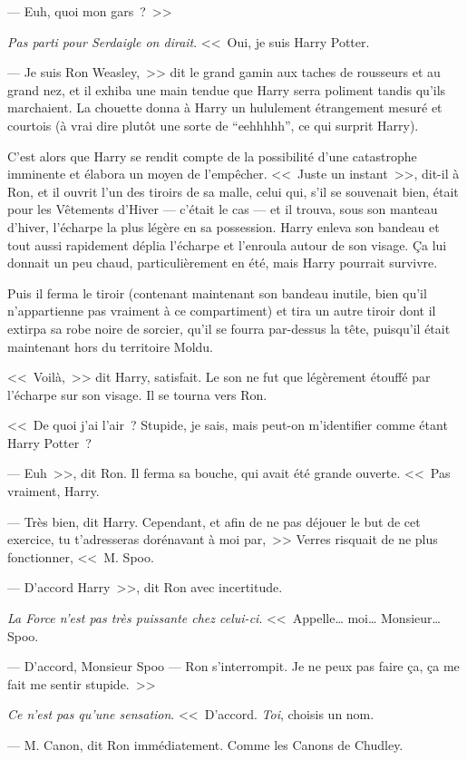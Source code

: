 --- Euh, quoi mon gars~?~>>

\emph{Pas parti pour Serdaigle on dirait}. <<~Oui, je suis Harry Potter.

--- Je suis Ron Weasley,~>> dit le grand gamin aux taches de rousseurs et au grand nez, et il exhiba une main tendue que Harry serra poliment tandis qu'ils marchaient. La chouette donna à Harry un hululement étrangement mesuré et courtois (à vrai dire plutôt une sorte de “eehhhhh”, ce qui surprit Harry).

C'est alors que Harry se rendit compte de la possibilité d'une catastrophe imminente et élabora un moyen de l'empêcher. <<~Juste un instant~>>, dit-il à Ron, et il ouvrit l'un des tiroirs de sa malle, celui qui, s'il se souvenait bien, était pour les Vêtements d'Hiver — c'était le cas — et il trouva, sous son manteau d'hiver, l'écharpe la plus légère en sa possession. Harry enleva son bandeau et tout aussi rapidement déplia l'écharpe et l'enroula autour de son visage. Ça lui donnait un peu chaud, particulièrement en été, mais Harry pourrait survivre.

Puis il ferma le tiroir (contenant maintenant son bandeau inutile, bien qu'il n'appartienne pas vraiment à ce compartiment) et tira un autre tiroir dont il extirpa sa robe noire de sorcier, qu'il se fourra par-dessus la tête, puisqu'il était maintenant hors du territoire Moldu.

<<~Voilà,~>> dit Harry, satisfait. Le son ne fut que légèrement étouffé par l'écharpe sur son visage. Il se tourna vers Ron.

<<~De quoi j'ai l'air~? Stupide, je sais, mais peut-on m'identifier comme étant Harry Potter~?

--- Euh~>>, dit Ron. Il ferma sa bouche, qui avait été grande ouverte. <<~Pas vraiment, Harry.

--- Très bien, dit Harry. Cependant, et afin de ne pas déjouer le but de cet exercice, tu t'adresseras dorénavant à moi par,~>> Verres risquait de ne plus fonctionner, <<~M. Spoo.

--- D'accord Harry~>>, dit Ron avec incertitude.

\emph{La Force n'est pas très puissante chez celui-ci}. <<~Appelle… moi… Monsieur… Spoo.

--- D'accord, Monsieur Spoo — Ron s'interrompit. Je ne peux pas faire ça, ça me fait me sentir stupide.~>>

\emph{Ce n'est pas qu'une sensation}. <<~D'accord. \emph{Toi}, choisis un nom.

--- M. Canon, dit Ron immédiatement. Comme les Canons de Chudley.

